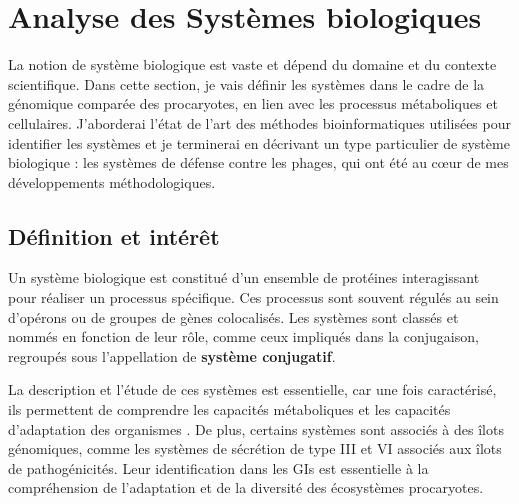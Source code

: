 \section{Analyse des Systèmes biologiques}
\label{sec:sys_bio}

La notion de système biologique est vaste et dépend du domaine et du contexte scientifique. Dans cette section, je vais définir les systèmes dans le cadre de la génomique comparée des procaryotes, en lien avec les processus métaboliques et cellulaires. J'aborderai l'état de l'art des méthodes bioinformatiques utilisées pour identifier les systèmes et je terminerai en décrivant un type particulier de système biologique : les systèmes de défense contre les phages, qui ont été au c\oe ur de mes développements méthodologiques.

\subsection{Définition et intérêt}

Un système biologique est constitué d’un ensemble de protéines interagissant pour réaliser un processus spécifique. Ces processus sont souvent régulés au sein d’opérons ou de groupes de gènes colocalisés. Les systèmes sont classés et nommés en fonction de leur rôle, comme ceux impliqués dans la conjugaison, regroupés sous l’appellation de \textbf{système conjugatif}.

La description et l'étude de ces systèmes est essentielle, car une fois caractérisé, ils permettent de comprendre les capacités métaboliques et les capacités d'adaptation des organismes \cite{alberts_cell_1998}. De plus, certains systèmes sont associés à des îlots génomiques, comme les systèmes de sécrétion de type III et VI associés aux îlots de pathogénicités\cite{pallen_bacterial_2007}. Leur identification dans les GIs est essentielle à la compréhension de l'adaptation et de la diversité des écosystèmes procaryotes. 

